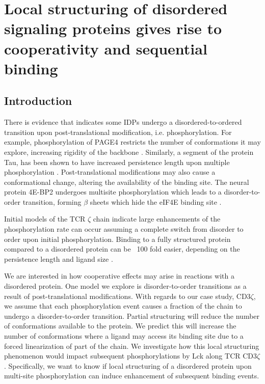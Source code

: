 \documentclass[../../AdvancementSummary.tex]{subfiles}
\begin{document}
\section{Local structuring of disordered signaling proteins gives rise to cooperativity and sequential binding}
\label{sec:LocalStruct}


\subsection{Introduction}


There is evidence that indicates some IDPs undergo a disordered-to-ordered transition upon post-translational modification, i.e. phosphorylation. For example, phosphorylation of PAGE4 restricts the number of conformations it may explore, increasing rigidity of the backbone \cite{He2015}. Similarly, a segment of the protein Tau, has been shown to have increased persistence length upon multiple phosphorylation \cite{Chin2016}. Post-translational modifications may also cause a conformational change, altering the availability of the binding site. The neural protein 4E-BP2 undergoes multisite phosphorylation which leads to a disorder-to-order transition, forming $\beta$ sheets which hide the eIF4E binding site \cite{Bah2015}. 

Initial models of the TCR $\zeta$ chain indicate large enhancements of the phosphorylation rate can occur assuming a complete switch from disorder to order upon initial phosphorylation. Binding to a fully structured protein compared to a disordered protein can be ~100 fold easier, depending on the persistence length and ligand size \cite{Mukhopadhyay2016}.


We are interested in how cooperative effects may arise in reactions with a disordered protein. One model we explore is disorder-to-order transitions as a result of post-translational modifications. With regards to our case study, CD3$\zeta$, we assume that each phosphorylation event causes a fraction of the chain to undergo a disorder-to-order transition. Partial structuring will reduce the number of conformations available to the protein. We predict this will increase the number of conformations where a ligand may access its binding site due to a forced linearization of part of the chain. We investigate how this local structuring phenomenon would impact subsequent phosphorylations by Lck along TCR CD3$\zeta$. Specifically, we want to know if local structuring of a disordered protein upon multi-site phosphorylation can induce enhancement of subsequent binding events.
\end{document}

